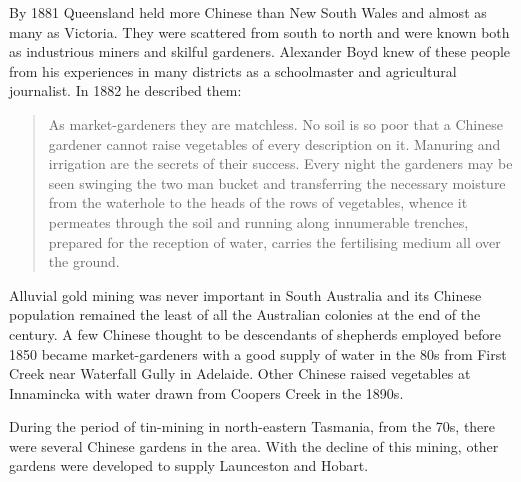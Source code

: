 By 1881 Queensland  held more Chinese
 than New South
Wales and almost as many as Victoria.  They were scattered from south
to north and were known both as industrious miners and skilful
gardeners.  Al\-exander Boyd  knew of these people
from his experiences in many districts as a schoolmaster and
agricultural journalist.  In 1882 he described
them:
\begin{quote}
	As market-gardeners they are matchless.  No soil is so poor
	that a Chinese gardener cannot raise vegetables of every
	description on it.  Manuring and irrigation are the secrets of
	their success.  Every night the gardeners may be seen swinging
	the two man bucket and transferring the necessary moisture
	from the waterhole to the heads of the rows of vegetables,
	whence it permeates through the soil and running along
	innumerable trenches, prepared for the reception of water,
	carries the fertilising medium all over the
	ground.
\end{quote}

Alluvial gold mining was never important in South Australia
 and its
Chinese  population remained the least of all the
Australian colonies at the end of the century.  A few Chinese thought
to be descendants of shepherds employed before 1850 became
market-gardeners with a good supply of water in the 80s from First
Creek  near Waterfall Gully 
in Adelaide.  Other Chinese raised vegetables at
Innamincka  with water drawn from Coopers Creek
 in the 1890s.

During the period of tin-mining in north-eastern Tasmania,
  from the
70s, there were several Chinese  gardens in the area.
With the decline of this mining, other gardens were developed to
supply Launceston
 and
Hobart.

